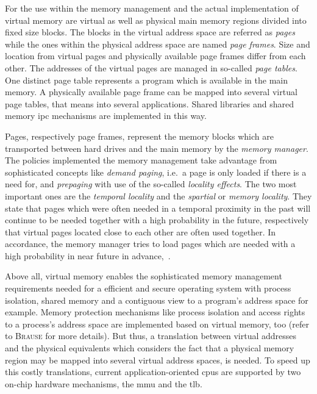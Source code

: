 %
For the use within the memory management and the actual implementation of virtual memory are virtual as well as physical main memory regions divided into fixed size blocks.
The blocks in the virtual address space are referred as \textit{pages} while the ones within the physical address space are named \textit{page frames}.
Size and location from virtual pages and physically available page frames differ from each other. 
The addresses of the virtual pages are managed in so-called \textit{page tables}.
One distinct page table represents a program which is available in the main memory\cite{brause2017betriebssysteme}.
A physically available page frame can be mapped into several virtual page tables, that means into several applications.
Shared libraries and shared memory \ac{ipc} mechanisms are implemented in this way\cite{brause2017betriebssysteme}.

Pages, respectively page frames, represent the memory blocks which are transported between hard drives and the main memory by the \textit{memory manager}.
The policies implemented the memory management take advantage from sophisticated concepts like \textit{demand paging}, i.e.\ a page is only loaded if there is a need for, and \textit{prepaging} with use of the so-called \textit{locality effects}.
The two most important ones are the \textit{temporal locality} and the \textit{spartial} or \textit{memory locality}.
They state that pages which were often needed in a temporal proximity in the past will continue to be needed together with a high probability in the future, respectively that virtual pages located close to each other are often used together.
In accordance, the memory manager tries to load pages which are needed with a high probability in near future in advance\cite{mandl2014Grundkurs},~\cite{brause2017betriebssysteme}.

Above all, virtual memory enables the sophisticated memory management requirements needed for a efficient and secure operating system with process isolation, shared memory and a contiguous view to a program's address space for example. 
Memory protection mechanisms like process isolation and access rights to a process's address space are implemented based on virtual memory, too (refer to \textsc{Brause}\cite{brause2017betriebssysteme} for more details).
But thus, a translation between virtual addresses and the physical equivalents which considers the fact that a physical memory region may be mapped into several virtual address spaces, is needed. 
To speed up this costly translations, current application-oriented \acp{cpu} are supported by two on-chip hardware mechanisms, the \acf{mmu} and the \acf{tlb}.

